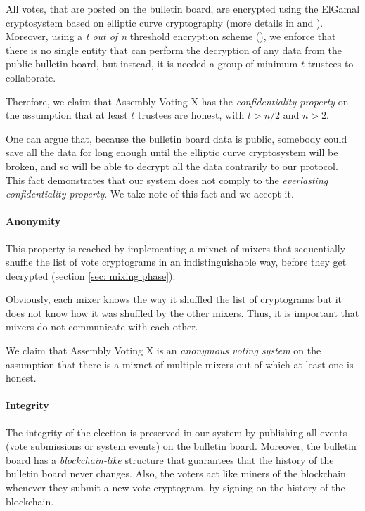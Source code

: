 All votes, that are posted on the bulletin board, are encrypted using the ElGamal cryptosystem based on elliptic curve cryptography (more details in  and ). Moreover, using a \textit{t out of n} threshold encryption scheme (), we enforce that there is no single entity that can perform the decryption of any data from the public bulletin board, but instead, it is needed a group of minimum $t$ trustees to collaborate.

Therefore, we claim that Assembly Voting X has the \textit{confidentiality property} on the assumption that at least $t$ trustees are honest, with \( t > n / 2 \) and \( n > 2 \).

One can argue that, because the bulletin board data is public, somebody could save all the data for long enough until the elliptic curve cryptosystem will be broken, and so will be able to decrypt all the data contrarily to our protocol. This fact demonstrates that our system does not comply to the \textit{everlasting confidentiality property}. We take note of this fact and we accept it.

\paragraph{Anonymity}
This property is reached by implementing a mixnet of mixers that sequentially shuffle the list of vote cryptograms in an indistinguishable way, before they get decrypted (section \ref{sec: mixing phase}).

Obviously, each mixer knows the way it shuffled the list of cryptograms but it does not know how it was shuffled by the other mixers. Thus, it is important that mixers do not communicate with each other.

We claim that Assembly Voting X is an \textit{anonymous voting system} on the assumption that there is a mixnet of multiple mixers out of which at least one is honest.

\paragraph{Integrity}
The integrity of the election is preserved in our system by publishing all events (vote submissions or system events) on the bulletin board. Moreover, the bulletin board has a \textit{blockchain-like} structure that guarantees that the history of the bulletin board never changes. Also, the voters act like miners of the blockchain whenever they submit a new vote cryptogram, by signing on the history of the blockchain.

